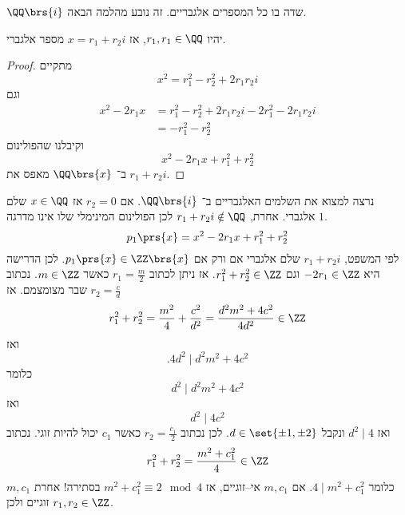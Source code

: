 \documentclass[a4paper,10pt,twoside,openany]{book}
\begin{document}
\begin{example}
$\QQ\brs{i}$
שדה בו כל המספרים אלגבריים.
זה נובע מהלמה הבאה.
\end{example}
\begin{lemma}
יהיו
$r_1,r_1 \in \QQ$,
אז
$x = r_1 + r_2 i$
מספר אלגברי.
\end{lemma}
\begin{proof}
מתקיים
\[x^2 = r_1^2 - r_2^2 + 2r_1 r_2 i\]
וגם
\begin{align*}
x^2 -2r_1 x &= r_1^2 - r_2^2 + 2r_1r_2 i - 2r_1^2 - 2r_1r_2 i \\&= -r_1^2 - r_2^2
\end{align*}
וקיבלנו שהפולינום
\[x^2 - 2r_1 x + r_1^2 + r_2^2\]
ב־%
$\QQ\brs{x}$
מאפס את
$r_1 + r_2 i$.
\end{proof}

\begin{example}
נרצה למצוא את השלמים האלגבריים ב־%
$\QQ\brs{i}$.
אם
$r_2 = 0$
אז
$x \in \QQ$
שלם אלגברי.
אחרת,
$r_1 + r_2 i \notin \QQ$
לכן הפולינום המינימלי שלו אינו מדרגה
$1$.
\[p_1\prs{x} = x^2 - 2r_1 x + r_1^2 + r_2^2\]
לפי המשפט,
$r_1 + r_2 i$
שלם אלגברי אם ורק אם
$p_1\prs{x} \in \ZZ\brs{x}$.
לכן הדרישה היא
$-2 r_1 \in \ZZ$
וגם
$r_1^2 + r_2^2 \in \ZZ$.
אז ניתן לכתוב
$r_1 = \frac{m}{2}$
כאשר
$m \in \ZZ$.
נכתוב
$r_2 = \frac{c}{d}$
שבר מצומצמם.
אז
\[r_1^2 + r_2^2 = \frac{m^2}{4} + \frac{c^2}{d^2} = \frac{d^2 m^2 + 4c^2}{4d^2} \in \ZZ\]
ואז
\[\text{.}4d^2 \mid d^2 m^2 + 4c^2\]
כלומר
\[d^2 \mid d^2 m^2 + 4c^2\]
ואז
\[d^2 \mid 4c^2\]
ואז
$d^2 \mid 4$
ונקבל
$d \in \set{\pm 1, \pm 2}$.
לכן נכתוב
$r_2 = \frac{c_1}{2}$
כאשר
$c_1$
יכול להיות זוגי.
נכתוב
\[r_1^2 + r_2^2 = \frac{m^2 + c_1^2}{4} \in \ZZ\]
כלומר
$4 \mid m^2 + c_1^2$.
אם
$m,c_1$
אי–זוגיים, אז
$m^2 + c_1^2 \equiv 2\mod{4}$
בסתירה!
אחרת
$m,c_1$
זוגיים ולכן
$r_1,r_2 \in \ZZ$.
\end{example}
\end{document}
